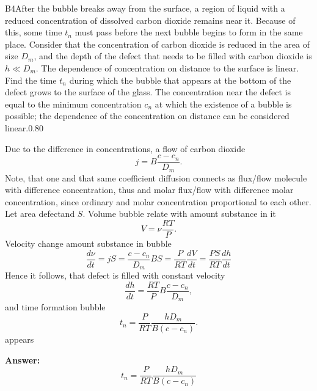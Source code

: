 \documentclass[11pt,a4paper]{article}
\begin{document}
\begin{solcard}{B4}{After the bubble breaks away from the surface, a region of liquid with a reduced concentration of dissolved carbon dioxide remains near it. Because of this, some time $t_n$ must pass before the next bubble begins to form in the same place. Consider that the concentration of carbon dioxide is reduced in the area of size $D_m$, and the depth of the defect that needs to be filled with carbon dioxide is $h \ll D_m$. The dependence of concentration on distance to the surface is linear. Find the time $t_n$ during which the bubble that appears at the bottom of the defect grows to the surface of the glass. The concentration near the defect is equal to the minimum concentration $c_n$ at which the existence of a bubble is possible; the dependence of the concentration on distance can be considered linear.}{0.80}

Due to the difference in concentrations, a flow of carbon dioxide $$ j = B \frac{c - c_n}{D_m}. $$ Note, that one and that same coefficient diffusion connects as flux/flow molecule with difference concentration, thus and molar flux/flow with difference molar concentration, since ordinary and molar concentration proportional to each other. Let area defectand $S$. Volume bubble relate with amount substance in it $$ V = \nu \frac{RT}{P}. $$ Velocity change amount substance in bubble $$ \frac{d\nu}{dt} = jS= \frac{c-c_n}{D_m}BS = \frac{P}{RT}\frac{dV}{dt} = \frac{PS}{RT} \frac{dh}{dt} $$ Hence it follows, that defect is filled with constant velocity $$ \frac{dh}{dt} = \frac{RT}{P} B\frac{c - c_n}{D_m}, $$ and time formation bubble $$ t_n =  \frac{P}{RT} \frac{h D_m}{B(c-c_n)}. $$ appears

\par\smallskip\noindent\textbf{Answer:} $$ t_n =  \frac{P}{RT} \frac{h D_m}{B(c-c_n)} $$
\end{solcard}
\end{document}
